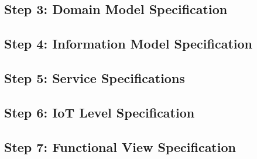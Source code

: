 \documentclass[conference]{IEEEtran}
\begin{document}
\subsection{Step 3: Domain Model Specification}
%

\subsection{Step 4: Information Model Specification}

\subsection{Step 5: Service Specifications}

\subsection{Step 6: IoT Level Specification}

\subsection{Step 7: Functional View Specification}
\end{document}
